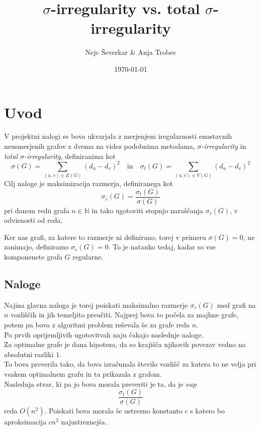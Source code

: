 \documentclass[ letterpaper, titlepage, fleqn]{article}
\begin{document}
\title{$\sigma$-irregularity vs. total $\sigma$-irregularity}
\author{Nejc Ševerkar \& Anja Trobec}
\date{\today}
\maketitle
\pagebreak

\thispagestyle{empty}
\tableofcontents
\pagebreak

\section{Uvod}
V projektni nalogi se bova ukvarjala z merjenjem iregularnosti enostavnih neusmerjenih grafov z
dvema na videz podobnima metodama, {\em $\sigma$-irregularity} in {\em total $\sigma$-irregularity},
definiranima kot 
$$
\sigma(G) = \sum_{(u, v) \in E(G)}(d_u - d_v)^2 
\quad \text{in} \quad
\sigma_t(G) = \sum_{(u, v) \in V(G)}(d_u - d_v)^2
$$
Cilj naloge je maksimizacija razmerja, definiranega kot 
$$\sigma_r(G) = \frac{\sigma_t(G)}{\sigma(G)}$$
pri danem redu grafa $n \in \mathbb{N}$ in tako ugotoviti 
stopnjo naraščanja $\sigma_r(G)$, v odvisnosti od reda.

Ker nas grafi, za katere to razmerje ni definirano,
torej v primeru $\sigma(G) = 0$, ne zanimajo, definiramo $\sigma_r(G) = 0$.
To je natanko tedaj, kadar so vse komponenete grafa $G$ regularne.

\subsection{Naloge}

Najina glavna naloga je torej poiskati maksimalno razmerje $\sigma_r(G)$ med grafi na $n$
vozliščih in jih temeljito preučiti. Najprej bova to počela za majhne grafe, potem pa bova 
z algoritmi problem reševala še za grafe reda $n$. \\

Po prvih oprijemljivih ugotovitvah naju čakajo naslednje naloge. \\

Za optimalne grafe je dana hipoteza, da so krajišča njihovih povezav vedno na absolutni razliki $1$. \\
To bova preverila tako, da bova izračunala število vozlišč za katera
to ne velja pri vsakem optimalnem grafu in ta prikazala z grafom. \\

Naslednja stvar, ki pa jo bova morala preveriti je ta, da je $sup$ $$\frac{\sigma_t(G)}{\sigma(G)}$$ 
reda $O(n^2)$. 
Poiskati bova morala še ustrezno konstanto $c$ s katero bo aproksimacija $cn^2$ najustreznejša.
\end{document}
